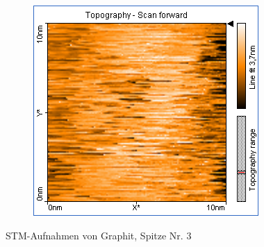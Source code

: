 \begin{figure}
\begin{subfigure}[b]{\picwidth}
        \caption{}
        \label{fig:graphit_01_02}
    \end{subfigure}
    \begin{subfigure}[b]{\picwidth}
        \includegraphics[width=\textwidth]{data/Graphit/pic_01_03_10nm}
        \caption{}
        \label{fig:graphit_01_03}
    \end{subfigure}
    \caption{STM-Aufnahmen von Graphit, Spitze Nr. 3}\label{fig:graphit_01}
\end{figure}

